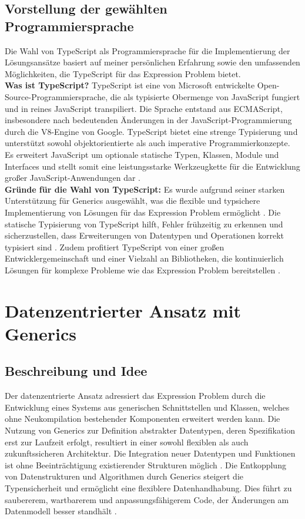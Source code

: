 \documentclass{easychair}
\begin{document}
  \subsection{Vorstellung der gewählten Programmiersprache}
  Die Wahl von TypeScript als Programmiersprache für die Implementierung der Lösungsansätze basiert auf meiner persönlichen Erfahrung sowie den umfassenden Möglichkeiten, die TypeScript für das Expression Problem bietet.\\

\textbf{Was ist TypeScript?}
  TypeScript ist eine von Microsoft entwickelte Open-Source-Programmiersprache, die als typisierte Obermenge von JavaScript fungiert und in reines JavaScript transpiliert. Die Sprache entstand aus ECMAScript, insbesondere nach bedeutenden Änderungen in der JavaScript-Programmierung durch die V8-Engine von Google. TypeScript bietet eine strenge Typisierung und unterstützt sowohl objektorientierte als auch imperative Programmierkonzepte. Es erweitert JavaScript um optionale statische Typen, Klassen, Module und Interfaces und stellt somit eine leistungsstarke Werkzeugkette für die Entwicklung großer JavaScript-Anwendungen dar \cite{typescript2019deepdive}.\\

\textbf{Gründe für die Wahl von TypeScript:} Es wurde aufgrund seiner starken Unterstützung für Generics ausgewählt, was die flexible und typsichere Implementierung von Lösungen für das Expression Problem ermöglicht \cite{torgersen2004expression}. Die statische Typisierung von TypeScript hilft, Fehler frühzeitig zu erkennen und sicherzustellen, dass Erweiterungen von Datentypen und Operationen korrekt typisiert sind \cite{rozentals2019typescript}. Zudem profitiert TypeScript von einer großen Entwicklergemeinschaft und einer Vielzahl an Bibliotheken, die kontinuierlich Lösungen für komplexe Probleme wie das Expression Problem bereitstellen \cite{typescript2019deepdive}.

\section{Datenzentrierter Ansatz mit Generics}
  \subsection{Beschreibung und Idee}
  Der datenzentrierte Ansatz adressiert das Expression Problem durch die Entwicklung eines Systems aus generischen Schnittstellen und Klassen, welches ohne Neukompilation bestehender Komponenten erweitert werden kann. Die Nutzung von Generics zur Definition abstrakter Datentypen, deren Spezifikation erst zur Laufzeit erfolgt, resultiert in einer sowohl flexiblen als auch zukunftssicheren Architektur. Die Integration neuer Datentypen und Funktionen ist ohne Beeinträchtigung existierender Strukturen möglich \cite{torgersen2004expression}. Die Entkopplung von Datenstrukturen und Algorithmen durch Generics steigert die Typensicherheit und ermöglicht eine flexiblere Datenhandhabung. Dies führt zu saubererem, wartbarerem und anpassungsfähigerem Code, der Änderungen am Datenmodell besser standhält \cite{wadler1998expression}.
\end{document}
